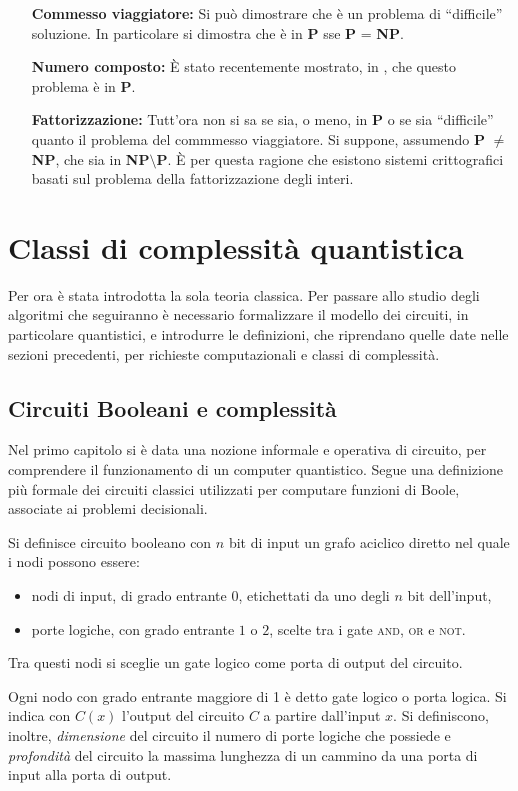 \begin{enumerate}[align=left]
 \item[\textbf{Commesso viaggiatore:}] Si può dimostrare che è un problema di ``difficile'' soluzione.
 In particolare si dimostra che è in \textbf{P} sse \textbf{P} = \textbf{NP}.
 \item[\textbf{Numero composto:}] È stato recentemente mostrato, in \cite{Article:PRIMESinP}, che questo problema è in \textbf{P}.
 \item[\textbf{Fattorizzazione:}] Tutt'ora non si sa se sia, o meno, in \textbf{P} o se sia ``difficile'' quanto il problema del commmesso viaggiatore.
 Si suppone, assumendo \textbf{P} $\neq$ \textbf{NP}, che sia in \textbf{NP}$\setminus$\textbf{P}.
 È per questa ragione che esistono sistemi crittografici basati sul problema della fattorizzazione degli interi.
\end{enumerate}

\section{Classi di complessità quantistica}
Per ora è stata introdotta la sola teoria classica.
Per passare allo studio degli algoritmi che seguiranno è necessario formalizzare il modello dei circuiti, in particolare quantistici, e introdurre le definizioni, che riprendano quelle date nelle sezioni precedenti, per richieste computazionali e classi di complessità.

\subsection{Circuiti Booleani e complessità}
Nel primo capitolo si è data una nozione informale e operativa di circuito, per comprendere il funzionamento di un computer quantistico.
Segue una definizione più formale dei circuiti classici utilizzati per computare funzioni di Boole, associate ai problemi decisionali.
\begin{defn}
 Si definisce {\upshape circuito booleano} con $n$ bit di input un grafo aciclico diretto nel quale i nodi possono essere:
 \begin{itemize}
  \item {\upshape nodi di input}, di grado entrante $0$, etichettati da uno degli $n$ bit dell'input,
  \item {\upshape porte logiche}, con grado entrante $1$ o $2$, scelte tra i gate \textsc{and}, \textsc{or} e \textsc{not}.
 \end{itemize}
 Tra questi nodi si sceglie un gate logico come porta di {\upshape output} del circuito.
\end{defn}
Ogni nodo con grado entrante maggiore di 1 è detto gate logico o porta logica.
Si indica con $C(x)$ l'output del circuito $C$ a partire dall'input $x$.
Si definiscono, inoltre, \textit{dimensione} del circuito il numero di porte logiche che possiede e \textit{profondità} del circuito la massima lunghezza di un cammino da una porta di input alla porta di output.


